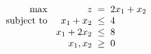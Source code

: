 \documentclass[a4paper, 10pt]{article}
\begin{document}
\begin{subproblems_alpha}[start=3]
    \item
    \[
    \begin{array}{@{\hspace{2mm}} r @{\hspace{2mm}} r @{\hspace{2mm}} c @{\hspace{2mm}} l}
        \text{max } & z & = & 2x_1 + x_2 \\
        \text{subject to } & x_1 + x_2 & \leq & 4 \\
        & x_1 + 2x_2 & \leq & 8 \\
        & x_1, x_2 & \geq & 0
    \end{array}
    \]
\end{subproblems_alpha}
\end{document}
